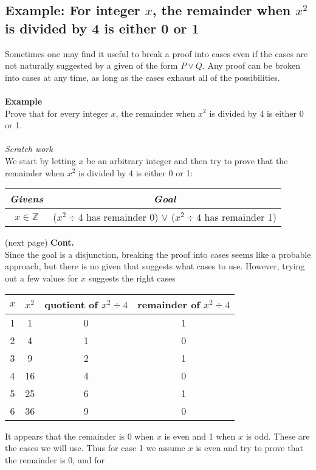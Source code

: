 \documentclass{report}
\theoremstyle{definition}
\begin{document}
\subsection{Example: For integer $x$, the remainder when $x^2$ is divided by 4 is either 0 or 1}
Sometimes one may find it useful to break a proof into cases even if the cases are not naturally suggested by a given of the form $P\lor Q$. Any proof can be broken into cases at any time,
as long as the cases exhaust all of the possibilities.\\
\vspace{1mm}\\
\textbf{Example}\\
Prove that for every integer $x$, the remainder when $x^2$ is divided by 4 is either 0 or 1.\\
\vspace{1mm}\\
\textit{Scratch work}\\
We start by letting $x$ be an arbitrary integer and then try to prove that the remainder when $x^2$ is divided by 4 is either 0 or 1:
\begin{center}
\begin{tabular}{c|c}
\textit{Givens}&\textit{Goal}\\
\hline
$x\in\mathbb Z$&($x^2\div4$ has remainder 0) $\lor$ ($x^2\div4$ has remainder 1)\\
\end{tabular}
\end{center}
(next page)\newpage
\noindent\textbf{Cont.}\\
Since the goal is a disjunction, breaking the proof into cases seems like a probable approach, but there is no given that suggests what cases to use. However, trying out a few values for $x$
suggests the right cases
\begin{center}
\begin{tabular}{cccc}
$x$&$x^2$&quotient of $x^2\div4$&remainder of $x^2\div4$\\
\hline
1&1&0&1\\
2&4&1&0\\
3&9&2&1\\
4&16&4&0\\
5&25&6&1\\
6&36&9&0
\end{tabular}
\end{center}
It appears that the remainder is 0 when $x$ is even and 1 when $x$ is odd. These are the cases we will use. Thus for case 1 we assume $x$ is even and try to prove that the remainder is 0, and for
\end{document}
